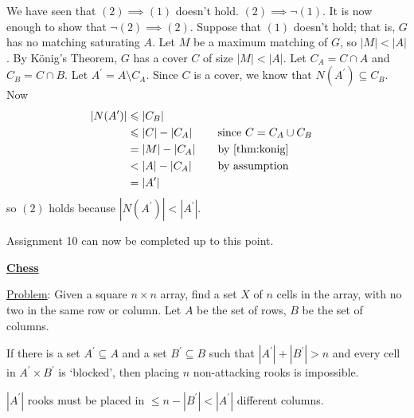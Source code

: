 \begin{Proof}{}{}
    We have seen that $ (2)\implies (1) $ doesn't hold. $ (2)\implies \lnot (1) $.
    It is now enough to show that $ \lnot(2)\implies (2) $. Suppose that $ (1) $ doesn't hold;
    that is, $ G $ has no matching saturating $ A $. Let $ M $ be a maximum matching of $ G $,
    so $ |M|<|A| $. By König's Theorem, $ G $ has a cover $ C $ of size $ |M|<|A| $.
    Let $ C_A = C\cap A $ and $ C_B = C\cap B $. Let $ A^\prime=A\setminus C_A $. Since
    $ C $ is a cover, we know that $ N(A^\prime)\subseteq C_B $. Now
    \begin{equation*}
        \begin{aligned}
            |N(A^\prime)|
             & \leqslant |C_B|                                          \\
             & \leqslant |C|-|C_A| & \quad & \text{since }C=C_A\cup C_B \\
             & =|M|-|C_A|          &       & \text{by~\Cref{thm:konig}} \\
             & < |A|-|C_A|         &       & \text{by assumption}       \\
             & =|A^\prime|
        \end{aligned}
    \end{equation*}
    so $ (2) $ holds because $ |N(A^\prime)|<|A^\prime| $.
\end{Proof}
\begin{Remark}
    Assignment 10 can now be completed up to this point.
\end{Remark}

\textbf{\underline{Chess}}

\underline{Problem}: Given a square $ n\times n $ array, find a set $ X $
of $ n $ cells in the array, with no two in the same row or column.
Let $ A $ be the set of rows, $ B $ be the set of columns.


\begin{Proposition}{}{}
    If there is a set $ A^\prime \subseteq A $ and a set $ B^\prime \subseteq B $
    such that $ |A^\prime|+|B^\prime|>n $ and every cell in $ A^\prime \times B^\prime $
    is `blocked', then placing $ n $ non-attacking rooks is impossible.
\end{Proposition}

\begin{Proof}{}{}
    $ |A^\prime| $ rooks must be placed in $ \leqslant n-|B^\prime|<|A^\prime| $
    different columns.
\end{Proof}

